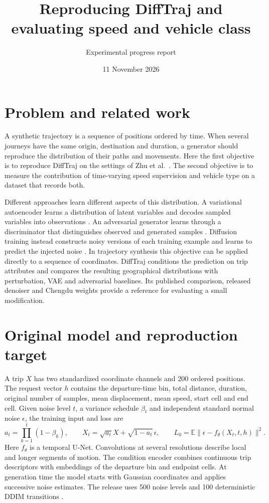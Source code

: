 \documentclass[11pt,a4paper]{article}
\title{Reproducing DiffTraj and evaluating speed and vehicle class}
\author{Experimental progress report}
\date{11 November 2026}
\begin{document}
\maketitle
\section{Problem and related work}
A synthetic trajectory is a sequence of positions ordered by time. When several journeys have the same origin, destination and duration, a generator should reproduce the distribution of their paths and movements. Here the first objective is to reproduce DiffTraj on the settings of Zhu et al.\ \cite{difftraj}. The second objective is to measure the contribution of time-varying speed supervision and vehicle type on a dataset that records both.

Different approaches learn different aspects of this distribution. A variational autoencoder learns a distribution of latent variables and decodes sampled variables into observations \cite{vae}. An adversarial generator learns through a discriminator that distinguishes observed and generated samples \cite{gan}. Diffusion training instead constructs noisy versions of each training example and learns to predict the injected noise \cite{ddpm}. In trajectory synthesis this objective can be applied directly to a sequence of coordinates. DiffTraj conditions the prediction on trip attributes and compares the resulting geographical distributions with perturbation, VAE and adversarial baselines. Its published comparison, released denoiser and Chengdu weights provide a reference for evaluating a small modification.

\section{Original model and reproduction target}
A trip $X$ has two standardized coordinate channels and 200 ordered positions. The request vector $h$ contains the departure-time bin, total distance, duration, original number of samples, mean displacement, mean speed, start cell and end cell. Given noise level $t$, a variance schedule $\beta_t$ and independent standard normal noise $\epsilon$, the training input and loss are
\[
 a_t=\prod_{k=1}^t(1-\beta_k),\qquad
 X_t=\sqrt{a_t}X+\sqrt{1-a_t}\,\epsilon,\qquad
 L_0=\mathbb E\|\epsilon-f_\theta(X_t,t,h)\|^2 .
\]
Here $f_\theta$ is a temporal U-Net. Convolutions at several resolutions describe local and longer segments of motion. The condition encoder combines continuous trip descriptors with embeddings of the departure bin and endpoint cells. At generation time the model starts with Gaussian coordinates and applies successive noise estimates. The release uses 500 noise levels and 100 deterministic DDIM transitions \cite{ddim}.
\end{document}
